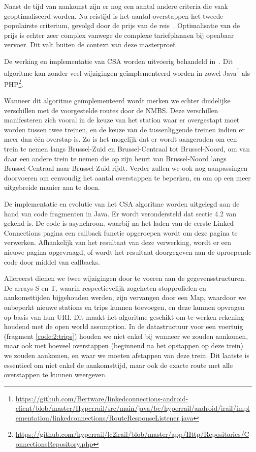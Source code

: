 Naast de tijd van aankomst zijn er nog een aantal andere criteria die vaak geoptimaliseerd worden. Na reistijd is het aantal overstappen het tweede populairste criterium, gevolgd door de prijs van de reis~\citep{strasser17}. Optimalisatie van de prijs is echter zeer complex vanwege de complexe tariefplannen bij openbaar vervoer\citep{muller06}. Dit valt buiten de context van deze masterproef.

De werking en implementatie van CSA worden uitvoerig behandeld in~\citep{strasser17}. Dit algoritme kan zonder veel wijzigingen geïmplementeerd worden in zowel Java\footnote{\url{https://github.com/Bertware/linkedconnections-android-client/blob/master/Hyperrail/src/main/java/be/hyperrail/android/irail/implementation/linkedconnections/RouteResponseListener.java}} als PHP\footnote{\url{https://github.com/hyperrail/lc2irail/blob/master/app/Http/Repositories/ConnectionsRepository.php}}.

Wanneer dit algoritme geïmplementeerd wordt merken we echter duidelijke verschillen met de voorgestelde routes door de NMBS. Deze verschillen manifesteren zich vooral in de keuze van het station waar er overgestapt moet worden tussen twee treinen, en de keuze van de tussenliggende treinen indien er meer dan één overstap is. Zo is het mogelijk dat er wordt aangeraden om een trein te nemen langs Brussel-Zuid en Brussel-Centraal tot Brussel-Noord, om van daar een andere trein te nemen die op zijn beurt van Brussel-Noord langs Brussel-Centraal naar Brussel-Zuid rijdt. 
Verder zullen we ook nog aanpassingen doorvoeren om eenvoudig het aantal overstappen te beperken, en om op een meer uitgebreide manier aan  te doen.

De implementatie en evolutie van het CSA algoritme worden uitgelegd aan de hand van code fragmenten in Java. Er wordt verondersteld dat sectie 4.2 van \cite{strasser17} gekend is. De code is asynchroon, waarbij na het laden van de eerste Linked Connections pagina een callback functie opgeroepen wordt om deze pagina te verwerken. Afhankelijk van het resultaat van deze verwerking, wordt er een nieuwe pagina opgevraagd, of wordt het resultaat doorgegeven aan de oproepende code door middel van callbacks.

Allereerst dienen we twee wijzigingen door te voeren aan de gegevensstructuren. De arrays S en T, waarin respectievelijk zogeheten stopprofielen en aankomsttijden bijgehouden werden, zijn vervangen door een Map, waardoor we onbeperkt nieuwe stations en trips kunnen toevoegen, en deze kunnen opvragen op basis van hun URI. Dit maakt het algoritme geschikt om te werken rekening houdend met de open world assumption. In de datastructuur voor een voertuig (fragment \ref{code:2:trips}) houden we niet enkel bij wanneer we zouden aankomen, maar ook met hoeveel overstappen (beginnend na het opstappen op deze trein) we zouden aankomen, en waar we moeten afstappen van deze trein. Dit laatste is essentieel om niet enkel de aankomsttijd, maar ook de exacte route met alle overstappen te kunnen weergeven. 

